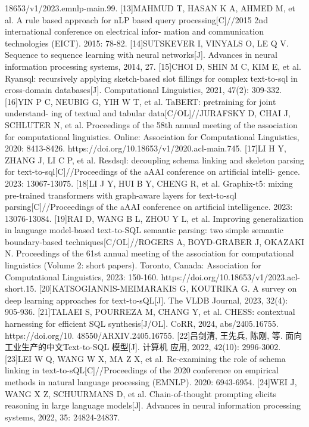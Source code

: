 \documentclass[12pt,a4paper,openright,UTF8]{ctexbook}
\begin{document}
18653/v1/2023.emnlp-main.99.
[13]MAHMUD T, HASAN K A, AHMED M, et al. A rule based approach for nLP
based query processing[C]//2015 2nd international conference on electrical infor-
mation and communication technologies (EICT). 2015: 78-82.
[14]SUTSKEVER I, VINYALS O, LE Q V. Sequence to sequence learning with neural
networks[J]. Advances in neural information processing systems, 2014, 27.
[15]CHOI D, SHIN M C, KIM E, et al. Ryansql: recursively applying sketch-based
slot fillings for complex text-to-sql in cross-domain databases[J]. Computational
Linguistics, 2021, 47(2): 309-332.
[16]YIN P C, NEUBIG G, YIH W T, et al. TaBERT: pretraining for joint understand-
ing of textual and tabular data[C/OL]//JURAFSKY D, CHAI J, SCHLUTER N,
et al. Proceedings of the 58th annual meeting of the association for computational
linguistics. Online: Association for Computational Linguistics, 2020: 8413-8426.
https://doi.org/10.18653/v1/2020.acl-main.745.
[17]LI H Y, ZHANG J, LI C P, et al. Resdsql: decoupling schema linking and skeleton
parsing for text-to-sql[C]//Proceedings of the aAAI conference on artificial intelli-
gence. 2023: 13067-13075.
[18]LI J Y, HUI B Y, CHENG R, et al. Graphix-t5: mixing pre-trained transformers with
graph-aware layers for text-to-sql parsing[C]//Proceedings of the aAAI conference
on artificial intelligence. 2023: 13076-13084.
[19]RAI D, WANG B L, ZHOU Y L, et al. Improving generalization in language
model-based text-to-SQL semantic parsing: two simple semantic boundary-based
techniques[C/OL]//ROGERS A, BOYD-GRABER J, OKAZAKI N. Proceedings
of the 61st annual meeting of the association for computational linguistics (Volume
2: short papers). Toronto, Canada: Association for Computational Linguistics,
2023: 150-160. https://doi.org/10.18653/v1/2023.acl-short.15.
[20]KATSOGIANNIS-MEIMARAKIS G, KOUTRIKA G. A survey on deep learning
approaches for text-to-sQL[J]. The VLDB Journal, 2023, 32(4): 905-936.
[21]TALAEI S, POURREZA M, CHANG Y, et al. CHESS: contextual harnessing for
efficient SQL synthesis[J/OL]. CoRR, 2024, abs/2405.16755. https://doi.org/10.
48550/ARXIV.2405.16755.
[22]吕剑清, 王先兵, 陈刚, 等. 面向工业生产的中文Text-to-SQL 模型[J]. 计算机
应用, 2022, 42(10): 2996-3002.
[23]LEI W Q, WANG W X, MA Z X, et al. Re-examining the role of schema linking
in text-to-sQL[C]//Proceedings of the 2020 conference on empirical methods in
natural language processing (EMNLP). 2020: 6943-6954.
[24]WEI J, WANG X Z, SCHUURMANS D, et al. Chain-of-thought prompting elicits
reasoning in large language models[J]. Advances in neural information processing
systems, 2022, 35: 24824-24837.
\end{document}
